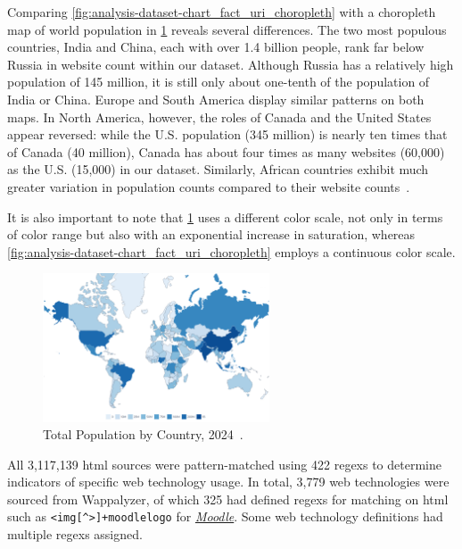 Comparing \cref{fig:analysis-dataset-chart_fact_uri_choropleth} with a choropleth map of world population in \cref{fig:analysis-dataset-population} reveals several differences.
The two most populous countries, India and China, each with over 1.4 billion people, rank far below Russia in website count within our dataset.
Although Russia has a relatively high population of 145 million, it is still only about one-tenth of the population of India or China.
Europe and South America display similar patterns on both maps.
In North America, however, the roles of Canada and the United States appear reversed: while the U.S. population (345 million) is nearly ten times that of Canada (40 million), Canada has about four times as many websites (60,000) as the U.S. (15,000) in our dataset.
Similarly, African countries exhibit much greater variation in population counts compared to their website counts~\cite{WPR2024}.

It is also important to note that \cref{fig:analysis-dataset-population} uses a different color scale, not only in terms of color range but also with an exponential increase in saturation, whereas \cref{fig:analysis-dataset-chart_fact_uri_choropleth} employs a continuous color scale.

\begin{figure}[H]
    \centering
    \includegraphics[width=0.6\textwidth]{figures/charts/population_choropleth.png}
    \caption{Total Population by Country, 2024~\cite{WPR2024}.}
    \label{fig:analysis-dataset-population}
\end{figure}

All 3,117,139 \ac{html} sources were pattern-matched using 422 \acp{regex} to determine indicators of specific web technology usage.
In total, 3,779 web technologies were sourced from Wappalyzer, of which 325 had defined \acp{regex} for matching on \ac{html} such as \texttt{\textless img[{\textasciicircum}>]+moodlelogo} for \href{https://moodle.de/}{\textit{Moodle}}.
Some web technology definitions had multiple \acp{regex} assigned.

